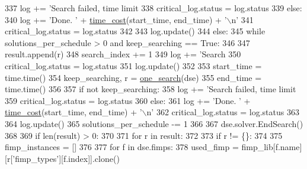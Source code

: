 \begin{DoxyCode}
{{{{{{{{{{{{{{{{337                         log += \textcolor{stringliteral}{'Search failed, time limit %
338                         critical\_log.status = log.status
339                     \textcolor{keywordflow}{else}:
340                         log += \textcolor{stringliteral}{'Done. '} + \hyperlink{namespacesylva_1_1dse_1_1dse_acf83688e18cc0859483b4c9bb70183fd}{time\_cost}(start\_time, end\_time) + \textcolor{stringliteral}{'\(\backslash\)n'}
341                         critical\_log.status = log.status
342 
343                     log.update()
344             \textcolor{keywordflow}{else}:
345                 \textcolor{keywordflow}{while} solutions\_per\_schedule > 0 \textcolor{keywordflow}{and} keep\_searching == \textcolor{keyword}{True}:
346 
347                     result.append(r)
348                     search\_index += 1
349                     log += \textcolor{stringliteral}{'Search %
350                     critical\_log.status = log.status
351                     log.update()
352 
353                     start\_time = time.time()
354                     keep\_searching, r = \hyperlink{namespacesylva_1_1dse_1_1dse_a27653b05dda8ab9dab8aa948db5b860a}{one\_search}(dse)
355                     end\_time = time.time()
356 
357                     \textcolor{keywordflow}{if} \textcolor{keywordflow}{not} keep\_searching:
358                         log += \textcolor{stringliteral}{'Search failed, time limit %
359                         critical\_log.status = log.status
360                     \textcolor{keywordflow}{else}:
361                         log += \textcolor{stringliteral}{'Done. '} + \hyperlink{namespacesylva_1_1dse_1_1dse_acf83688e18cc0859483b4c9bb70183fd}{time\_cost}(start\_time, end\_time) + \textcolor{stringliteral}{'\(\backslash\)n'}
362                         critical\_log.status = log.status
363 
364                     log.update()
365                     solutions\_per\_schedule -= 1
366 
367             dse.solver.EndSearch()
368 
369             \textcolor{keywordflow}{if} len(result) > 0:
370 
371                 \textcolor{keywordflow}{for} r \textcolor{keywordflow}{in} result:
372 
373                     \textcolor{keywordflow}{if} r != \{\}:
374 
375                         fimp\_instances = []
376 
377                         \textcolor{keywordflow}{for} f \textcolor{keywordflow}{in} dse.fimps:
378                             used\_fimp = fimp\_lib[f.name][r[\textcolor{stringliteral}{'fimp\_types'}][f.index]].clone()
}}}}}}}}}}}}}}}}}}}
\end{DoxyCode}
